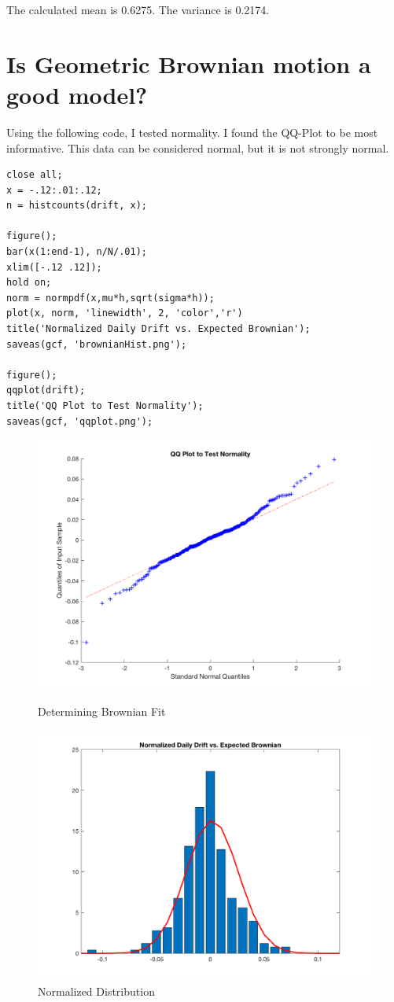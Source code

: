 \documentclass[]{article}
\begin{document}
The calculated mean is 0.6275. The variance is 0.2174.

\section{Is Geometric Brownian motion a good model?}
Using the following code, I tested normality. I found the QQ-Plot to be most informative. This data can be considered normal, but it is not strongly normal.

\begin{lstlisting}
close all;
x = -.12:.01:.12;
n = histcounts(drift, x);

figure();
bar(x(1:end-1), n/N/.01);
xlim([-.12 .12]);
hold on;
norm = normpdf(x,mu*h,sqrt(sigma*h));
plot(x, norm, 'linewidth', 2, 'color','r')
title('Normalized Daily Drift vs. Expected Brownian');
saveas(gcf, 'brownianHist.png');

figure();
qqplot(drift);
title('QQ Plot to Test Normality');
saveas(gcf, 'qqplot.png');
\end{lstlisting}

\begin{figure}[!ht]
	\centering
	\begin{minipage}{.5\textwidth}
		\centering
		\includegraphics[width=0.8\linewidth]{qqplot}
		\caption{Determining Brownian Fit}
		\label{fig:test1}
	\end{minipage}%
	\begin{minipage}{.5\textwidth}
		\centering
		\includegraphics[width=0.8\linewidth]{brownianHist}
		\caption{Normalized Distribution}
		\label{fig:test2}
	\end{minipage}
\end{figure}
 
\end{document}
